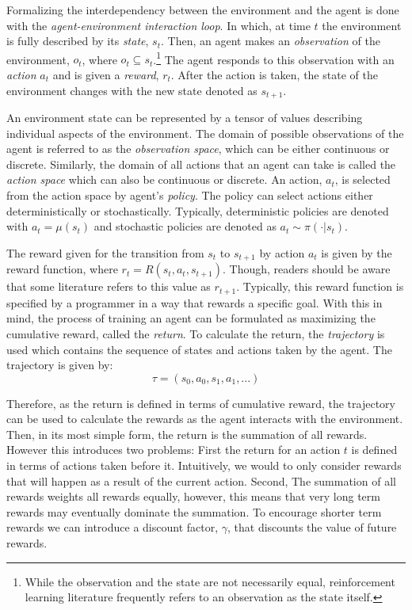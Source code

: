 \documentclass[conference]{IEEEtran}
\begin{document}
Formalizing the interdependency between the environment and the agent is done with the \textit{agent-environment interaction loop}. In which, at time $t$ the environment is fully described by its \textit{state}, $s_t$. Then, an agent makes an \textit{observation} of the environment, $o_t$, where $o_t \subseteq s_t$.\footnote{While the observation and the state are not necessarily equal, reinforcement learning literature frequently refers to an observation as the state itself.} The agent responds to this observation with an \textit{action} $a_t$ and is given a \textit{reward}, $r_t$. After the action is taken, the state of the environment changes with the new state denoted as $s_{t+1}$.

An environment state can be represented by a tensor of values describing individual aspects of the environment. The domain of possible observations of the agent is referred to as the \textit{observation space}, which can be either continuous or discrete. Similarly, the domain of all actions that an agent can take is called the \textit{action space} which can also be continuous or discrete. An action, $a_t$, is selected from the action space by agent's \textit{policy}. The policy can select actions either deterministically or stochastically. Typically, deterministic policies are denoted with $a_t = \mu(s_t)$ and stochastic policies are denoted as $a_t \sim \pi(\cdot | s_t)$. \cite{spinning_up_intro}



The reward given for the transition from $s_t$ to $s_{t+1}$ by action $a_t$ is given by the reward function, where $r_t = R(s_t, a_t, s_{t+1})$. Though, readers should be aware that some literature refers to this value as $r_{t+1}$. Typically, this reward function is specified by a programmer in a way that rewards a specific goal. With this in mind, the process of training an agent can be formulated as maximizing the cumulative reward, called the \textit{return}. To calculate the return, the \textit{trajectory} is used which contains the sequence of states and actions taken by the agent. The trajectory is given by:
$$
    \tau = (s_0, a_0, s_1, a_1, ...)
$$

Therefore, as the return is defined in terms of cumulative reward, the trajectory can be used to calculate the rewards as the agent interacts with the environment. Then, in its most simple form, the return is the summation of all rewards. However this introduces two problems: First the return for an action $t$ is defined in terms of actions taken before it. Intuitively, we would to only consider rewards that will happen as a result of the current action. Second, The summation of all rewards weights all rewards equally, however, this means that very long term rewards may eventually dominate the summation. To encourage shorter term rewards we can introduce a discount factor, $\gamma$, that discounts the value of future rewards.
\end{document}
